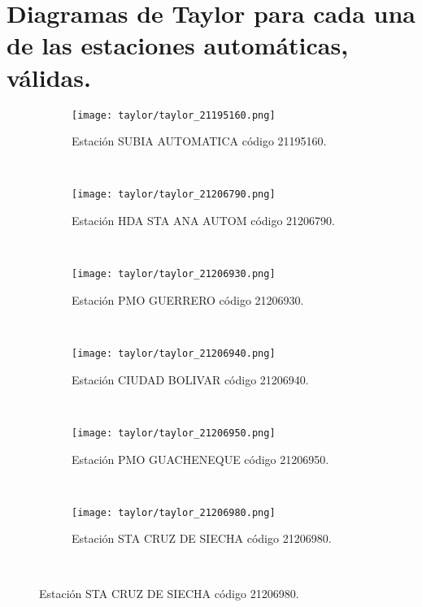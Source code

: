 
\chapter{Diagramas de Taylor para cada una de las estaciones automáticas, válidas.}
\label{anexo:diag_taylor_estaciones_aut_val}

\centering
\begin{figure}[H]
\centering

\begin{subfigure}[normla]{0.4\textwidth}
\texttt{[image: taylor/taylor\_21195160.png]}
\caption{Estación SUBIA AUTOMATICA código 21195160.}
\end{subfigure}
~
\begin{subfigure}[normla]{0.4\textwidth}
\texttt{[image: taylor/taylor\_21206790.png]}
\caption{Estación HDA STA ANA AUTOM código 21206790.}
\end{subfigure}
~
\begin{subfigure}[normla]{0.4\textwidth}
\texttt{[image: taylor/taylor\_21206930.png]}
\caption{Estación PMO GUERRERO código 21206930.}
\end{subfigure}
~
\begin{subfigure}[normla]{0.4\textwidth}
\texttt{[image: taylor/taylor\_21206940.png]}
\caption{Estación CIUDAD BOLIVAR código 21206940.}
\end{subfigure}
~
\begin{subfigure}[normla]{0.4\textwidth}
\texttt{[image: taylor/taylor\_21206950.png]}
\caption{Estación PMO GUACHENEQUE código 21206950.}
\end{subfigure}
~
\begin{subfigure}[normla]{0.4\textwidth}
\texttt{[image: taylor/taylor\_21206980.png]}
\caption{Estación STA CRUZ DE SIECHA código 21206980.}
\end{subfigure}
~
\end{figure}
           
